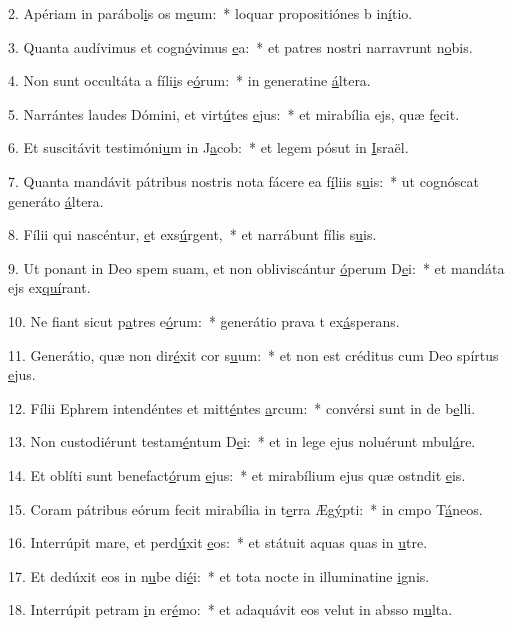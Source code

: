 2. Apériam in parábol\uline{i}s os m\uline{e}um:~* loquar propositiónes b in\uline{í}tio.\par 
3. Quanta audívimus et cogn\uline{ó}vimus \uline{e}a:~* et patres nostri narravrunt n\uline{o}bis.\par 
4. Non sunt occultáta a fíli\uline{i}s e\uline{ó}rum:~* in generatine \uline{á}ltera.\par 
5. Narrántes laudes Dómini, et virt\uline{ú}tes \uline{e}jus:~* et mirabília ejs, quæ f\uline{e}cit.\par 
6. Et suscitávit testimóni\uline{u}m in J\uline{a}cob:~* et legem pósut in \uline{I}sraël.\par 
7. Quanta mandávit pátribus nostris nota fácere ea f\uline{í}liis s\uline{u}is:~* ut cognóscat generáto \uline{á}ltera.\par 
8. Fílii qui nascéntur, \uline{e}t exs\uline{ú}rgent,~* et narrábunt fílis s\uline{u}is.\par 
9. Ut ponant in Deo spem suam, et non obliviscántur \uline{ó}perum D\uline{e}i:~* et mandáta ejs ex\uline{quí}rant.\par 
10. Ne fiant sicut p\uline{a}tres e\uline{ó}rum:~* generátio prava t ex\uline{á}sperans.\par 
11. Generátio, quæ non dir\uline{é}xit cor s\uline{u}um:~* et non est créditus cum Deo spírtus \uline{e}jus.\par 
12. Fílii Ephrem intendéntes et mitt\uline{é}ntes \uline{a}rcum:~* convérsi sunt in de b\uline{e}lli.\par 
13. Non custodiérunt testam\uline{é}ntum D\uline{e}i:~* et in lege ejus noluérunt mbul\uline{á}re.\par 
14. Et oblíti sunt benefact\uline{ó}rum \uline{e}jus:~* et mirabílium ejus quæ ostndit \uline{e}is.\par 
15. Coram pátribus eórum fecit mirabília in t\uline{e}rra Æg\uline{ý}pti:~* in cmpo T\uline{á}neos.\par 
16. Interrúpit mare, et perd\uline{ú}xit \uline{e}os:~* et státuit aquas quas in \uline{u}tre.\par 
17. Et dedúxit eos in n\uline{u}be di\uline{é}i:~* et tota nocte in illuminatine \uline{i}gnis.\par 
18. Interrúpit petram \uline{i}n er\uline{é}mo:~* et adaquávit eos velut in absso m\uline{u}lta.\par 
